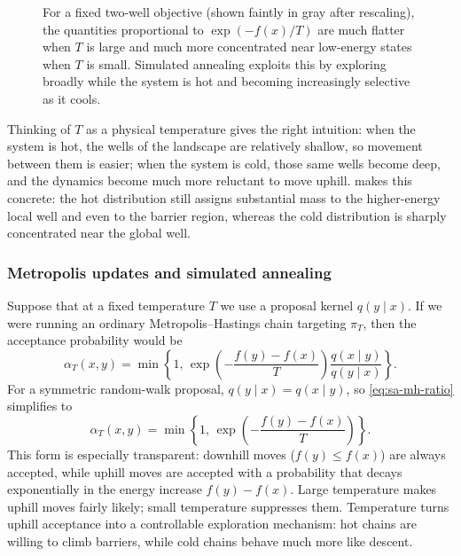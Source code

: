 \begin{figure}[t]
  \centering
  
  \caption{For a fixed two-well objective (shown faintly in gray after rescaling), the quantities proportional to $\exp(-f(x)/T)$ are much flatter when $T$ is large and much more concentrated near low-energy states when $T$ is small.
  Simulated annealing exploits this by exploring broadly while the system is hot and becoming increasingly selective as it cools.}
  \label{fig:sa-temperature-flattening}
\end{figure}

Thinking of $T$ as a physical temperature gives the right intuition:
when the system is hot, the wells of the landscape are relatively shallow, so movement between them is easier;
when the system is cold, those same wells become deep, and the dynamics become much more reluctant to move uphill.
 makes this concrete: the hot distribution still assigns substantial mass to the higher-energy local well and even to the barrier region, whereas the cold distribution is sharply concentrated near the global well.

\subsubsection{Metropolis updates and simulated annealing}
\label{subsubsec:sa-mh-view}

Suppose that at a fixed temperature $T$ we use a proposal kernel $q(y\mid x)$.
If we were running an ordinary Metropolis--Hastings chain targeting $\pi_T$, then the acceptance probability would be
\begin{equation}
  \alpha_T(x,y)
  =
  \min\left\{
    1,\,
    \exp\!\left(-\frac{f(y)-f(x)}{T}\right)\frac{q(x\mid y)}{q(y\mid x)}
  \right\}.
  \label{eq:sa-mh-ratio}
\end{equation}
For a symmetric random-walk proposal, $q(y\mid x)=q(x\mid y)$, so \eqref{eq:sa-mh-ratio} simplifies to
\begin{equation}
  \alpha_T(x,y)
  =
  \min\left\{
    1,\,
    \exp\!\left(-\frac{f(y)-f(x)}{T}\right)
  \right\}.
  \label{eq:sa-symmetric-acceptance}
\end{equation}
This form is especially transparent:
downhill moves ($f(y)\le f(x)$) are always accepted, while uphill moves are accepted with a probability that decays exponentially in the energy increase $f(y)-f(x)$.
Large temperature makes uphill moves fairly likely; small temperature suppresses them.
Temperature turns uphill acceptance into a controllable exploration mechanism: hot chains are willing to climb barriers, while cold chains behave much more like descent.

